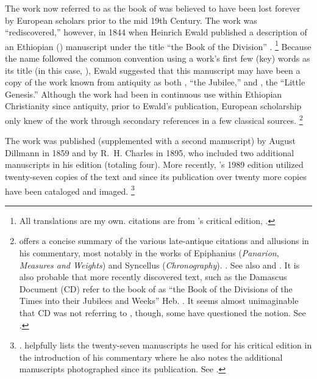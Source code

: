 
\nocite{dillamnn_jbw_kleine}
\nocite{ewald_zkm1844}


The work now referred to as the book of \jub was believed to have been lost forever by European scholars prior to the mid 19th Century. The work was ``rediscovered,'' however, in 1844 when Heinrich Ewald published a description of an Ethiopian (\geez) manuscript under the title ``the Book of the Division'' .%
        \footnote{All translations are my own. \geez citations are from \vanderkam's critical edition, \cite*{vanderkam1989}.}
Because the name followed the common convention using a work's first few (key) words as its title (in this case, ), Ewald suggested that this manuscript may have been a copy of the work known from antiquity as both , ``the Jubilee,'' and , the ``Little Genesis.''\autocite[176--179]{ewald_zkm1844} Although the work had been in continuous use within Ethiopian Christianity since antiquity, prior to Ewald's publication, European scholarship only knew of the work through secondary references in a few classical sources.%
        \footnote{\vanderkam offers a concise summary of the various late-antique citations and allusions in his commentary, most notably in the works of Epiphanius (\emph{Panarion}, \emph{Measures and Weights}) and Syncellus (\emph{Chronography}).
                \cite[1:10--14]{vanderkam2018}. See also 
                \cite{reed_kister-etal2015} and 
                \cite{kreps_ch2018}.
        It is also probable that more recently discovered text, such as the Damascus Document (CD) refer to the book of \jub as 
        ``the Book of the Divisions of the Times into their Jubilees and Weeks'' Heb. . It seems almost unimaginable that CD was not referring to \jub, though, some have questioned the notion. See \cite[242--248]{dimant_vanderkam-etal2006}.}

The work was published (supplemented with a second manuscript) by August Dillmann in 1859\autocite{dillmann1859} and by R.~H. Charles in 1895, who included two additional manuscripts in his edition (totaling four).\autocite{charles1895} More recently, \vanderkam's 1989 edition utilized twenty-seven copies of the text\autocite[1:xiv--xvi]{vanderkam1989} and since its publication over twenty more copies have been cataloged and imaged.%
        \footnote{%
                \cite{erho_bsoas2013}.
                \vanderkam helpfully lists the twenty-seven manuscripts he used for his critical edition in the introduction of his commentary where he also notes the additional manuscripts photographed since its publication. See 
                \cite[1:14--16]{vanderkam2018}.}

